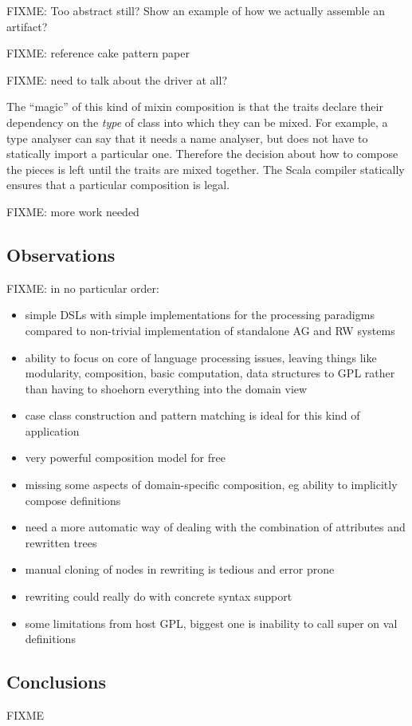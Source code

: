 FIXME: Too abstract still? Show an example of how we actually assemble an artifact?

FIXME: reference cake pattern paper

FIXME: need to talk about the driver at all?

The ``magic'' of this kind of mixin composition is that the traits declare their dependency on the \emph{type} of class into which they can be mixed.
For example, a type analyser can say that it needs a name analyser, but does not have to statically import a particular one.
Therefore the decision about how to compose the pieces is left until the traits are mixed together.
The Scala compiler statically ensures that a particular composition is legal.

FIXME: more work needed


\subsection{Observations}
\label{sec:kiama-observe}

FIXME: in no particular order:

\begin{itemize}
\item simple DSLs with simple implementations for the processing paradigms compared to non-trivial implementation of standalone AG and RW systems
\item ability to focus on core of language processing issues, leaving things like modularity, composition, basic computation, data structures to GPL rather than having to shoehorn everything into the domain view
\item case class construction and pattern matching is ideal for this kind of application
\item very powerful composition model for free
\item missing some aspects of domain-specific composition, eg ability to implicitly compose definitions
\item need a more automatic way of dealing with the combination of attributes and rewritten trees
\item manual cloning of nodes in rewriting is tedious and error prone
\item rewriting could really do with concrete syntax support
\item some limitations from host GPL, biggest one is inability to call super on val definitions
\end{itemize}

\subsection{Conclusions}

FIXME
